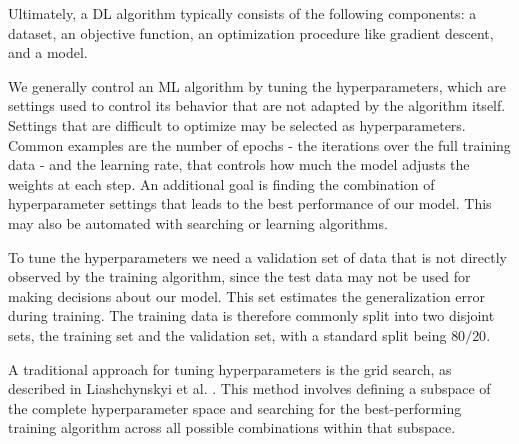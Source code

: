 Ultimately, a DL algorithm typically consists of the following components: a dataset, an objective function, an optimization procedure like gradient descent, and a model. %

We generally control an ML algorithm by tuning the hyperparameters, which are settings used to control its behavior that are not adapted by the algorithm itself. Settings that are difficult to optimize may be selected as hyperparameters. Common examples are the number of epochs - the iterations over the full training data - and the learning rate, that controls how much the model adjusts the weights at each step. An additional goal is finding the combination of hyperparameter settings that leads to the best performance of our model. This may also be automated with searching or learning algorithms.

To tune the hyperparameters we need a validation set of data that is not directly observed by the training algorithm, since the test data may not be used for making decisions about our model. This set estimates the generalization error during training. The training data is therefore commonly split into two disjoint sets, the training set and the validation set, with a standard split being $80/20$.

A traditional approach for tuning hyperparameters is the grid search, as described in Liashchynskyi et al. \cite{liashchynskyi2019grid}. This method involves defining a subspace of the complete hyperparameter space and searching for the best-performing training algorithm across all possible combinations within that subspace.

